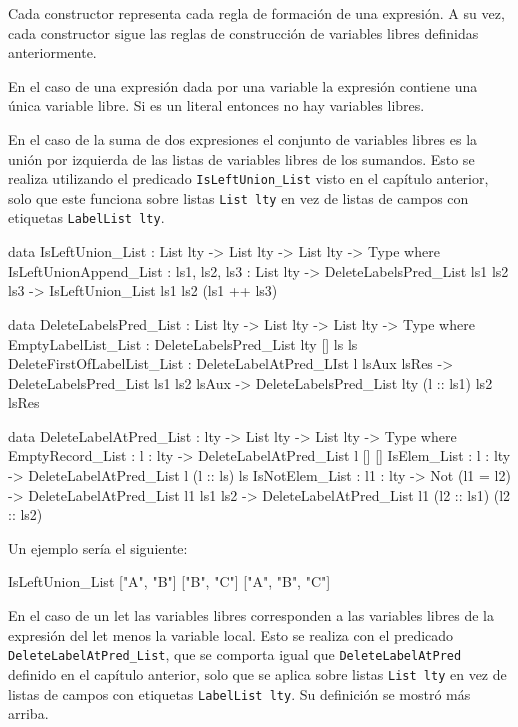 Cada constructor representa cada regla de formación de una expresión. A su vez, cada constructor sigue las reglas de construcción de variables libres definidas anteriormente.

En el caso de una expresión dada por una variable la expresión contiene una única variable libre. Si es un literal entonces no hay variables libres.

En el caso de la suma de dos expresiones el conjunto de variables libres es la unión por izquierda de las listas de variables libres de los sumandos. Esto se realiza utilizando el predicado \texttt{IsLeftUnion\_List} visto en el capítulo anterior, solo que este funciona sobre listas  \texttt{List lty} en vez de listas de campos con etiquetas \texttt{LabelList lty}.

\begin{code}
data IsLeftUnion_List : List lty -> List lty ->
  List lty -> Type where
  IsLeftUnionAppend_List :
    {ls1, ls2, ls3 : List lty} ->
    DeleteLabelsPred_List ls1 ls2 ls3 ->
    IsLeftUnion_List ls1 ls2 (ls1 ++ ls3)

data DeleteLabelsPred_List : List lty -> List lty ->
  List lty -> Type where
  EmptyLabelList_List : DeleteLabelsPred_List {lty} [] ls ls
  DeleteFirstOfLabelList_List : 
    DeleteLabelAtPred_LIst l lsAux lsRes ->
    DeleteLabelsPred_List ls1 ls2 lsAux ->
    DeleteLabelsPred_List {lty} (l :: ls1) ls2 lsRes

data DeleteLabelAtPred_List : lty -> List lty ->
  List lty -> Type where
  EmptyRecord_List : {l : lty} -> DeleteLabelAtPred_List l [] []
  IsElem_List : {l : lty} -> DeleteLabelAtPred_List l (l :: ls) ls
  IsNotElem_List : {l1 : lty} -> Not (l1 = l2) ->
    DeleteLabelAtPred_List l1 ls1 ls2 ->
    DeleteLabelAtPred_List l1 (l2 :: ls1) (l2 :: ls2)
\end{code}

Un ejemplo sería el siguiente:

\begin{code}
IsLeftUnion_List ["A", "B"] ["B", "C"]
  ["A", "B", "C"]
\end{code}

En el caso de un let las variables libres corresponden a las variables libres de la expresión del let menos la variable local. Esto se realiza con el predicado \texttt{DeleteLabelAtPred\_List}, que se comporta igual que \texttt{DeleteLabelAtPred} definido en el capítulo anterior, solo que se aplica sobre listas \texttt{List lty} en vez de listas de campos con etiquetas \texttt{LabelList lty}. Su definición se mostró más arriba.

